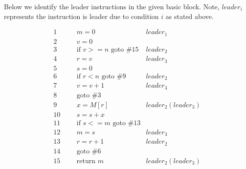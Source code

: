 \documentclass{article}
\begin{document}
    Below we identify the leader instructions in the given basic block. Note, $leader_i$ represents the instruction is leader due to condition $i$ as stated above.

    \begin{align*}
        1   &&& \text{$m = 0$}                  & leader_1 \\
        2   &&& \text{$v = 0$} \\
        3   &&& \text{if $v >= n$ goto \#15}    & leader_2 \\
        4   &&& \text{$r = v$}                  & leader_3 \\
        5   &&& \text{$s = 0$} \\
        6   &&& \text{if $r < n$ goto \#9}      & leader_2 \\
        7   &&& \text{$v = v + 1$}              & leader_3 \\
        8   &&& \text{goto \#3} \\
        9   &&& \text{$x = M[r]$}               & leader_2 (leader_3) \\
        10  &&& \text{$s = s + x$} \\
        11  &&& \text{if $s <= m$ goto \#13} \\
        12  &&& \text{$m = s$}                  & leader_3 \\
        13  &&& \text{$r = r + 1$}              & leader_2 \\
        14  &&& \text{goto \#6} \\
        15  &&& \text{return $m$}               & leader_2 (leader_3) \\
    \end{align*}
    
\end{document}
